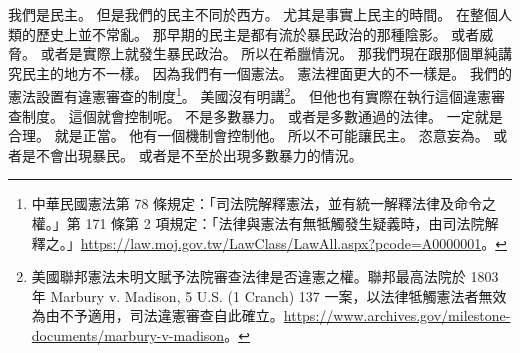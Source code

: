 \hypertarget{w01:cue:340}{}我們是民主。
\hypertarget{w01:cue:341}{}但是我們的民主不同於西方。
\hypertarget{w01:cue:342}{}尤其是事實上民主的時間。
\hypertarget{w01:cue:343}{}在整個人類的歷史上並不常亂。
\hypertarget{w01:cue:344}{}那早期的民主是都有流於暴民政治的那種陰影。
\hypertarget{w01:cue:345}{}或者威脅。
\hypertarget{w01:cue:346}{}或者是實際上就發生暴民政治。
\hypertarget{w01:cue:347}{}所以在希臘情況。
\hypertarget{w01:cue:348}{}那我們現在跟那個單純講究民主的地方不一樣。
\hypertarget{w01:cue:349}{}因為我們有一個憲法。
\hypertarget{w01:cue:350}{}憲法裡面更大的不一樣是。
\hypertarget{w01:cue:351}{}我們的憲法設置有違憲審查的制度\footnote{中華民國憲法第 78 條規定：「司法院解釋憲法，並有統一解釋法律及命令之權。」第 171 條第 2 項規定：「法律與憲法有無牴觸發生疑義時，由司法院解釋之。」\url{https://law.moj.gov.tw/LawClass/LawAll.aspx?pcode=A0000001}。}。
\hypertarget{w01:cue:352}{}美國沒有明講\footnote{美國聯邦憲法未明文賦予法院審查法律是否違憲之權。聯邦最高法院於 1803 年 Marbury v. Madison, 5 U.S. (1 Cranch) 137 一案，以法律牴觸憲法者無效為由不予適用，司法違憲審查自此確立。\url{https://www.archives.gov/milestone-documents/marbury-v-madison}。}。
\hypertarget{w01:cue:353}{}但他也有實際在執行這個違憲審查制度。
\hypertarget{w01:cue:354}{}這個就會控制呢。
\hypertarget{w01:cue:355}{}不是多數暴力。
\hypertarget{w01:cue:356}{}或者是多數通過的法律。
\hypertarget{w01:cue:357}{}一定就是合理。
\hypertarget{w01:cue:358}{}就是正當。
\hypertarget{w01:cue:359}{}他有一個機制會控制他。
\hypertarget{w01:cue:360}{}所以不可能讓民主。
\hypertarget{w01:cue:361}{}恣意妄為。
\hypertarget{w01:cue:362}{}或者是不會出現暴民。
\hypertarget{w01:cue:363}{}或者是不至於出現多數暴力的情況。

